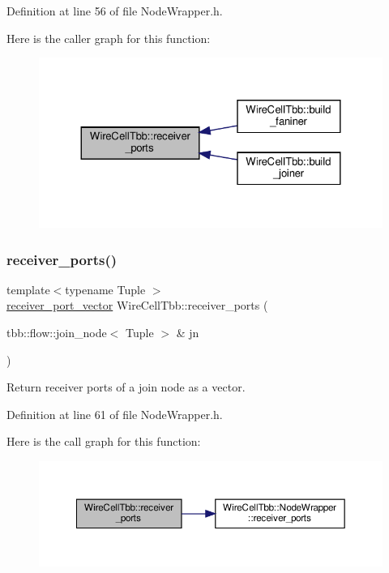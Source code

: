 Definition at line 56 of file Node\+Wrapper.\+h.

Here is the caller graph for this function\+:
\nopagebreak
\begin{figure}[H]
\begin{center}
\leavevmode
\includegraphics[width=324pt]{namespace_wire_cell_tbb_a6ecb68802302619dd9900975162a0354_icgraph}
\end{center}
\end{figure}
\mbox{\label{namespace_wire_cell_tbb_ad0cab88f6e89c84bde6bbea2bff842e9}} 
\subsubsection{\texorpdfstring{receiver\+\_\+ports()}{receiver\_ports()}\hspace{0.1cm}{\footnotesize\ttfamily [2/2]}}
{\footnotesize\ttfamily template$<$typename Tuple $>$ \\
\hyperlink{namespace_wire_cell_tbb_a87f42fe8a3ccc3bf9d315cb2d252c7af}{receiver\+\_\+port\+\_\+vector} Wire\+Cell\+Tbb\+::receiver\+\_\+ports (\begin{DoxyParamCaption}\item[{tbb\+::flow\+::join\+\_\+node$<$ Tuple $>$ \&}]{jn }\end{DoxyParamCaption})}



Return receiver ports of a join node as a vector. 



Definition at line 61 of file Node\+Wrapper.\+h.

Here is the call graph for this function\+:
\nopagebreak
\begin{figure}[H]
\begin{center}
\leavevmode
\includegraphics[width=350pt]{namespace_wire_cell_tbb_ad0cab88f6e89c84bde6bbea2bff842e9_cgraph}
\end{center}
\end{figure}
